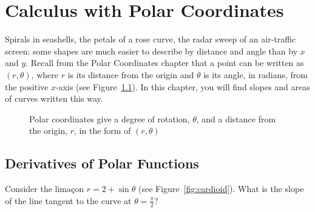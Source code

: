 \chapter{Calculus with Polar Coordinates}

Spirals in seashells, the petals of a rose curve, the radar sweep of an
air-traffic screen: some shapes are much easier to describe by distance
and angle than by $x$ and $y$. Recall from the Polar Coordinates chapter
that a point can be written as $(r, \theta)$, where $r$ is its distance from
the origin and $\theta$ is its angle, in radians, from the positive
$x$-axis (see Figure~\ref{fig:polarex}). In this chapter, you will find
slopes and areas of curves written this way.

\begin{figure}[H]
\centering
    \caption{Polar coordinates give a degree of rotation, $\theta$, and a 
    distance from the origin, $r$, in the form of $(r, \theta)$}
    \label{fig:polarex}
    \end{figure}

\section{Derivatives of Polar Functions}
Consider the lima\c{c}on $r = 2 + \sin{\theta}$ (see Figure~\ref{fig:cardioid}). What 
is the slope of the line tangent to the curve at $\theta = \frac{\pi}{2}$? 

